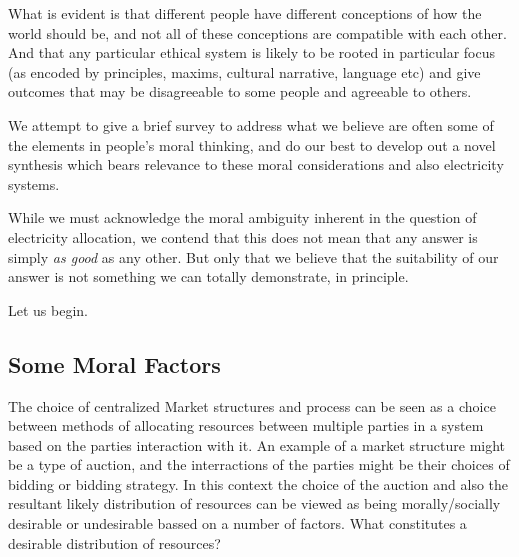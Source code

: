 What is evident is that different people have different conceptions of how the world should be, and not all of these conceptions are compatible with each other.
And that any particular ethical system is likely to be rooted in particular focus (as encoded by principles, maxims, cultural narrative, language etc) and give outcomes that may be disagreeable to some people and agreeable to others.


We attempt to give a brief survey to address what we believe are often some of the elements in people's moral thinking, and do our best to develop out a novel synthesis which bears relevance to these moral considerations and also electricity systems.

While we must acknowledge the moral ambiguity inherent in the question of electricity allocation, we contend that this does not mean that any answer is simply \textit{as good} as any other. But only that we believe that the suitability of our answer is not something we can totally demonstrate, in principle.

Let us begin.

\subsection{Some Moral Factors}

The choice of centralized Market structures and process can be seen as a choice between methods of allocating resources between multiple parties in a system based on the parties interaction with it.
An example of a market structure might be a type of auction, and the interractions of the parties might be their choices of bidding or bidding strategy.
In this context the choice of the auction and also the resultant likely distribution of resources can be viewed as being morally/socially desirable or undesirable bassed on a number of factors.
What constitutes a desirable distribution of resources?


